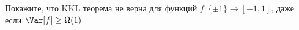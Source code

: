 Покажите, что KKL теорема не верна для функций $f\colon \{\pm 1\} \to [-1, 1]$, даже если
$\Var[f] \ge \Omega(1)$.
